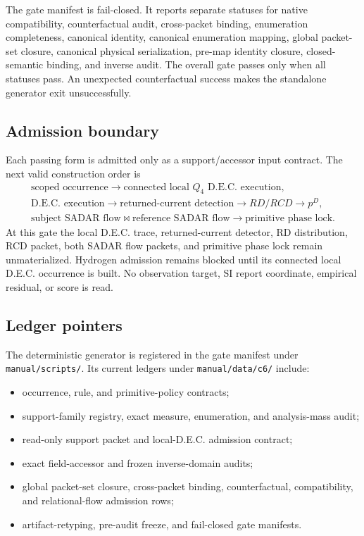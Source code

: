 The gate manifest is fail-closed.  It reports separate statuses for native
compatibility, counterfactual audit, cross-packet binding, enumeration
completeness, canonical identity, canonical enumeration mapping, global
packet-set closure, canonical physical serialization, pre-map identity closure,
closed-semantic binding, and inverse audit.  The overall gate passes only when
all statuses pass.  An unexpected counterfactual success makes the standalone
generator exit unsuccessfully.

\subsection{Admission boundary}

Each passing form is admitted only as a support/accessor input contract.  The
next valid construction order is
\[
\begin{gathered}
\text{scoped occurrence}
\to \text{connected local }Q_4\text{ D.E.C. execution},\\
\text{D.E.C. execution}
\to \text{returned-current detection}
\to RD/RCD
\to p^D,\\
\text{subject SADAR flow}
\bowtie \text{reference SADAR flow}
\to \text{primitive phase lock}.
\end{gathered}
\]
At this gate the local D.E.C. trace, returned-current detector, RD distribution,
RCD packet, both SADAR flow packets, and primitive phase lock remain
unmaterialized.  Hydrogen admission remains blocked until its connected local
D.E.C. occurrence is built.  No observation target, SI report coordinate,
empirical residual, or score is read.

\subsection{Ledger pointers}

The deterministic generator is registered in the gate manifest under
\texttt{manual/scripts/}.  Its current ledgers under
\texttt{manual/data/c6/} include:
\begin{itemize}
  \item occurrence, rule, and primitive-policy contracts;
  \item support-family registry, exact measure, enumeration, and analysis-mass audit;
  \item read-only support packet and local-D.E.C. admission contract;
  \item exact field-accessor and frozen inverse-domain audits;
  \item global packet-set closure, cross-packet binding, counterfactual, compatibility, and relational-flow admission rows;
  \item artifact-retyping, pre-audit freeze, and fail-closed gate manifests.
\end{itemize}

